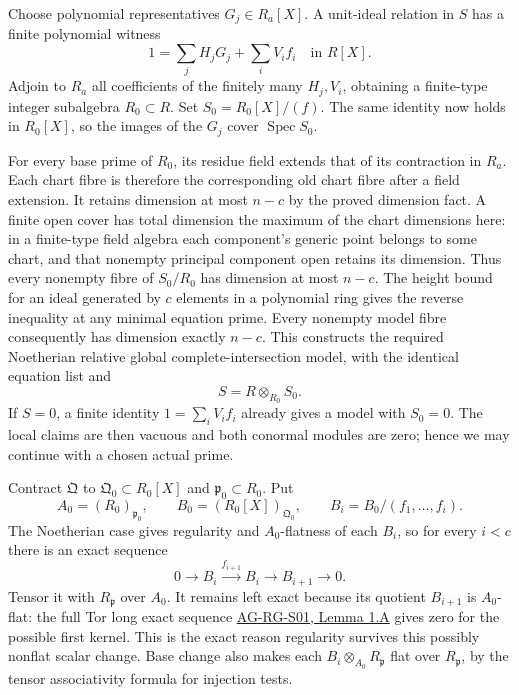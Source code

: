 \documentclass[11pt,a4paper,openany]{report}
\newcounter{none}
\begin{document}
Choose polynomial representatives \(G_j\in R_a[X]\). A unit-ideal relation in \(S\) has a finite polynomial witness \[1=\sum_j H_jG_j+\sum_i V_if_i\quad\text{in }R[X].\] Adjoin to \(R_a\) all coefficients of the finitely many \(H_j,V_i\), obtaining a finite-type integer subalgebra \(R_0\subset R\). Set \(S_0=R_0[X]/(f)\). The same identity now holds in \(R_0[X]\), so the images of the \(G_j\) cover \(\operatorname{Spec}S_0\).

For every base prime of \(R_0\), its residue field extends that of its contraction in \(R_a\). Each chart fibre is therefore the corresponding old chart fibre after a field extension. It retains dimension at most \(n-c\) by the proved dimension fact. A finite open cover has total dimension the maximum of the chart dimensions here: in a finite-type field algebra each component's generic point belongs to some chart, and that nonempty principal component open retains its dimension. Thus every nonempty fibre of \(S_0/R_0\) has dimension at most \(n-c\). The height bound for an ideal generated by \(c\) elements in a polynomial ring gives the reverse inequality at any minimal equation prime. Every nonempty model fibre consequently has dimension exactly \(n-c\). This constructs the required Noetherian relative global complete-intersection model, with the identical equation list and \[S=R\otimes_{R_0}S_0.\] If \(S=0\), a finite identity \(1=\sum_iV_if_i\) already gives a model with \(S_0=0\). The local claims are then vacuous and both conormal modules are zero; hence we may continue with a chosen actual prime.

Contract \(\mathfrak Q\) to \(\mathfrak Q_0\subset R_0[X]\) and \(\mathfrak p_0\subset R_0\). Put \[A_0=(R_0)_{\mathfrak p_0},\qquad
B_0=(R_0[X])_{\mathfrak Q_0},\qquad
B_i=B_0/(f_1,\ldots,f_i).\] The Noetherian case gives regularity and \(A_0\)-flatness of each \(B_i\), so for every \(i<c\) there is an exact sequence \[0\longrightarrow B_i\xrightarrow{f_{i+1}}B_i
\longrightarrow B_{i+1}\longrightarrow0.\] Tensor it with \(R_{\mathfrak p}\) over \(A_0\). It remains left exact because its quotient \(B_{i+1}\) is \(A_0\)-flat: the full Tor long exact sequence \href{https://github.com/KokunoYumeto/open-math-courses/blob/main/docs/courses/AG-RG/AG-RG-S01.md}{AG-RG-S01, Lemma 1.A} gives zero for the possible first kernel. This is the exact reason regularity survives this possibly nonflat scalar change. Base change also makes each \(B_i\otimes_{A_0}R_{\mathfrak p}\) flat over \(R_{\mathfrak p}\), by the tensor associativity formula for injection tests.
\end{document}
